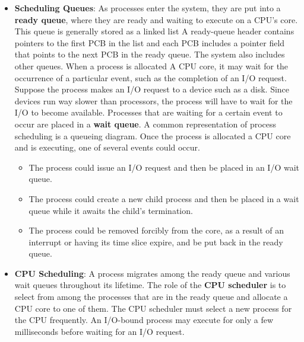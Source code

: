 \documentclass{report}
\begin{document}
\begin{itemize}
            \bigbreak \noindent 
            To meet this objectives, the process scheduler selects an available process for program execution on a core. Each CPU core can run one process at a time.
        \item \textbf{Scheduling Queues}: As processes enter the system, they are put into a \textbf{ready queue}, where they are ready and waiting to execute on a CPU’s core. This queue is generally stored as a linked list
            \bigbreak \noindent 
            A ready-queue header contains pointers to the first PCB in the list and each PCB includes a pointer field that points to the next PCB in the ready queue.
            \bigbreak \noindent 
            The system also includes other queues. When a process is allocated A CPU core, it may wait for the occurrence of a particular event, such as the completion of an I/O request. Suppose the process makes an I/O request to a device such as a disk. Since devices run way slower than processors, the process will have to wait for the I/O to become available. Processes that are waiting for a certain event to occur are placed in a \textbf{wait queue}.
            \bigbreak \noindent 
            A common representation of process scheduling is a queueing diagram. Once the process is allocated a CPU core and is executing, one of several events could occur.
            \begin{itemize}
                \item The process could issue an I/O request and then be placed in an I/O wait queue.
                \item The process could create a new child process and then be placed in a wait queue while it awaits the child’s termination.
                \item The process could be removed forcibly from the core, as a result of an interrupt or having its time slice expire, and be put back in the ready queue.
            \end{itemize}
        \item \textbf{CPU Scheduling}: A process migrates among the ready queue and various wait queues throughout its lifetime.
            \bigbreak \noindent 
            The role of the \textbf{CPU scheduler} is to select from among the processes that are in the ready queue and allocate a CPU core to one of them.
            \bigbreak \noindent 
            The CPU scheduler must select a new process for the CPU frequently. An I/O-bound process may execute for only a few milliseconds before waiting for an I/O request.

\end{itemize}
\end{document}
